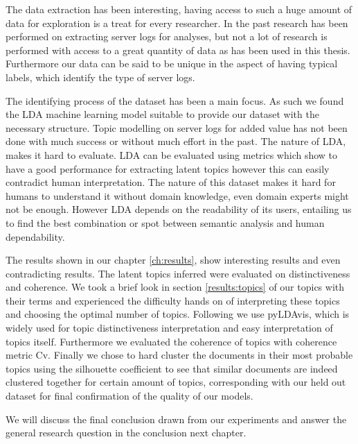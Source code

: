 The data extraction has been interesting, having access to such a huge amount of data for exploration is a treat for every researcher. In the past research has been performed on extracting server logs for analyses, but not a lot of research is performed with access to a great quantity of data as has been used in this thesis. Furthermore our data can be said to be unique in the aspect of having typical labels, which identify the type of server logs. 

The identifying process of the dataset has been a main focus. As such we found the LDA machine learning model suitable to provide our dataset with the necessary structure. Topic modelling on server logs for added value has not been done with much success or without much effort in the past. The nature of LDA, makes it hard to evaluate. LDA can be evaluated using metrics which show to have a good performance for extracting latent topics however this can easily contradict human interpretation. The nature of this dataset makes it hard for humans to understand it without domain knowledge, even domain experts might not be enough. However LDA depends on the readability of its users, entailing us to find the best combination or spot between semantic analysis and human dependability.

The results shown in our chapter \ref{ch:results}, show interesting results and even contradicting results. The latent topics inferred were evaluated on distinctiveness and coherence. We took a brief look in section \ref{results:topics} of our topics with their terms and experienced the difficulty hands on of interpreting these topics and choosing the optimal number of topics. Following we use pyLDAvis, which is widely used for topic distinctiveness interpretation and easy interpretation of topics itself. Furthermore we evaluated the coherence of topics with coherence metric Cv. Finally we chose to hard cluster the documents in their most probable topics using the silhouette coefficient to see that similar documents are indeed clustered together for certain amount of topics, corresponding with our held out dataset for final confirmation of the quality of our models.

We will discuss the final conclusion drawn from our experiments and answer the general research question in the conclusion next chapter.


